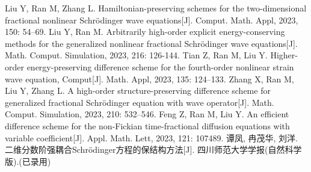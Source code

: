    \begin{mypaper}
      \begin{thebibliography}{99}  
       Liu Y, Ran M, Zhang L. Hamiltonian-preserving schemes for the two-dimensional fractional nonlinear Schrödinger wave equations[J]. Comput. Math. Appl, 2023, 150: 54–69.
       Liu Y, Ran M. Arbitrarily high-order explicit energy-conserving methods for the generalized nonlinear fractional Schrödinger wave equations[J]. Math. Comput. Simulation, 2023, 216: 126-144.
       Tian Z, Ran M, Liu Y. Higher-order energy-preserving difference scheme for the fourth-order nonlinear strain wave equation, Comput[J]. Math. Appl, 2023, 135: 124–133.
       Zhang X, Ran M, Liu Y, Zhang L. A high-order structure-preserving difference scheme for generalized fractional Schrödinger equation with wave operator[J]. Math. Comput. Simulation, 2023, 210: 532–546.
       Feng Z, Ran M, Liu Y. An efficient difference scheme for the non-Fickian time-fractional diffusion equations with variable coefficient[J]. Appl. Math. Lett, 2023, 121: 107489.
       谭凤, 冉茂华, 刘洋. 二维分数阶强耦合Schr{\"o}dinger方程的保结构方法[J]. 四川师范大学学报(自然科学版).(已录用)
      \end{thebibliography}
   \end{mypaper}
   